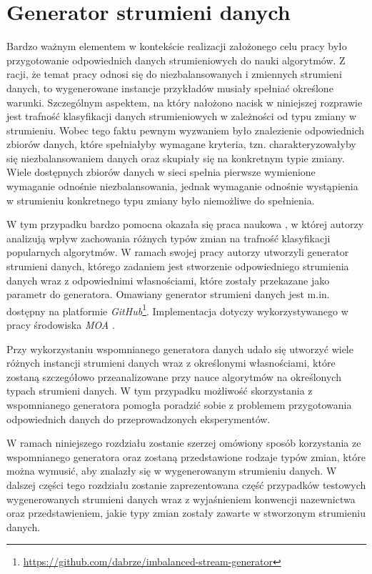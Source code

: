 \chapter{Generator strumieni danych}
\label{Chapter:Generator}

\noindent Bardzo ważnym elementem w kontekście realizacji założonego celu pracy było przygotowanie odpowiednich danych strumieniowych do nauki algorytmów. Z racji, że temat pracy odnosi się do niezbalansowanych i zmiennych strumieni danych, to wygenerowane instancje przykładów musiały spełniać określone warunki. Szczególnym aspektem, na który nałożono nacisk w niniejszej rozprawie jest trafność klasyfikacji danych strumieniowych w zależności od typu zmiany w strumieniu. Wobec tego faktu pewnym wyzwaniem było znalezienie odpowiednich zbiorów danych, które spełniałyby wymagane kryteria, tzn. charakteryzowałyby się niezbalansowaniem danych oraz skupiały się na konkretnym typie zmiany. Wiele dostępnych zbiorów danych w sieci spełnia pierwsze wymienione wymaganie odnośnie niezbalansowania, jednak wymaganie odnośnie wystąpienia w strumieniu konkretnego typu zmiany było niemożliwe do spełnienia.

W tym przypadku bardzo pomocna okazała się praca naukowa \cite{Article:TypyPrzykladow}, w której autorzy analizują wpływ zachowania różnych typów zmian na trafność klasyfikacji popularnych algorytmów. W ramach swojej pracy autorzy utworzyli generator strumieni danych, którego zadaniem jest stworzenie odpowiedniego strumienia danych wraz z odpowiednimi własnościami, które zostały przekazane jako parametr do generatora. Omawiany generator strumieni danych jest m.in. dostępny na platformie \textit{GitHub}\footnote{\url{https://github.com/dabrze/imbalanced-stream-generator}}. Implementacja dotyczy wykorzystywanego w pracy środowiska \textit{MOA} \cite{Article:MOA}.

Przy wykorzystaniu wspomnianego generatora danych udało się utworzyć wiele różnych instancji strumieni danych wraz z określonymi własnościami, które zostaną szczegółowo przeanalizowane przy nauce algorytmów na określonych typach strumieni danych. W tym przypadku możliwość skorzystania z wspomnianego generatora pomogła poradzić sobie z problemem przygotowania odpowiednich danych do przeprowadzonych eksperymentów.

W ramach niniejszego rozdziału zostanie szerzej omówiony sposób korzystania ze wspomnianego generatora oraz zostaną przedstawione rodzaje typów zmian, które można wymusić, aby znalazły się w wygenerowanym strumieniu danych. W dalszej części tego rozdziału zostanie zaprezentowana część przypadków testowych wygenerowanych strumieni danych wraz z wyjaśnieniem konwencji nazewnictwa oraz przedstawieniem, jakie typy zmian zostały zawarte w stworzonym strumieniu danych.

